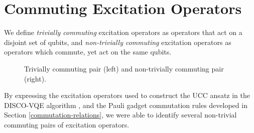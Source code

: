 \section{Commuting Excitation Operators}%
\label{operator-commutations}

We define \textit{trivially commuting} excitation operators as operators that act on a disjoint set of qubits, and \textit{non-trivially commuting} excitation operators as operators which commute, yet act on the same qubits.

\begin{figure}[H]
    \centering
    \caption{Trivially commuting pair (left) and non-trivially commuting pair (right).}
\end{figure}

By expressing the excitation operators used to construct the UCC ansatz in the DISCO-VQE algorithm \cite{Burton2023}, and the Pauli gadget commutation rules developed in Section \ref{commutation-relations}, we were able to identify several non-trivial commuting pairs of excitation operators.
